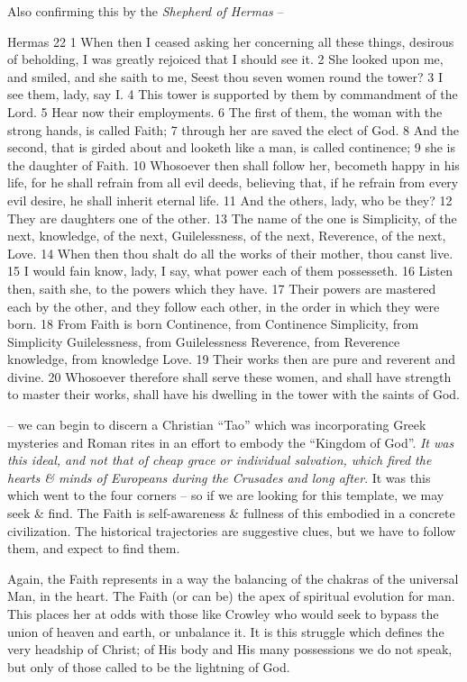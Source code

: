 Also confirming this by the \emph{Shepherd of Hermas} --

\begin{quotex}
Hermas 22 1 When then I ceased asking her concerning all these things, desirous of beholding, I was greatly rejoiced that I should see it. 2 She looked upon me, and smiled, and she saith to me, Seest thou seven women round the tower? 3 I see them, lady, say I. 4 This tower is supported by them by commandment of the Lord. 5 Hear now their employments. 6 The first of them, the woman with the strong hands, is called Faith; 7 through her are saved the elect of God. 8 And the second, that is girded about and looketh like a man, is called continence; 9 she is the daughter of Faith. 10 Whosoever then shall follow her, becometh happy in his life, for he shall refrain from all evil deeds, believing that, if he refrain from every evil desire, he shall inherit eternal life. 11 And the others, lady, who be they? 12 They are daughters one of the other. 13 The name of the one is Simplicity, of the next, knowledge, of the next, Guilelessness, of the next, Reverence, of the next, Love. 14 When then thou shalt do all the works of their mother, thou canst live. 15 I would fain know, lady, I say, what power each of them possesseth. 16 Listen then, saith she, to the powers which they have. 17 Their powers are mastered each by the other, and they follow each other, in the order in which they were born. 18 From Faith is born Continence, from Continence Simplicity, from Simplicity Guilelessness, from Guilelessness Reverence, from Reverence knowledge, from knowledge Love. 19 Their works then are pure and reverent and divine. 20 Whosoever therefore shall serve these women, and shall have strength to master their works, shall have his dwelling in the tower with the saints of God.
\end{quotex}


-- we can begin to discern a Christian ``Tao'' which was incorporating Greek mysteries and Roman rites in an effort to embody the ``Kingdom of God''. \emph{It was this ideal, and not that of cheap grace or individual salvation, which fired the hearts \& minds of Europeans during the Crusades and long after}. It was this which went to the four corners -- so if we are looking for this template, we may seek \& find. The Faith is self-awareness \& fullness of this embodied in a concrete civilization. The historical trajectories are suggestive clues, but we have to follow them, and expect to find them.

Again, the Faith represents in a way the balancing of the chakras of the universal Man, in the heart. The Faith (or can be) the apex of spiritual evolution for man. This places her at odds with those like Crowley who would seek to bypass the union of heaven and earth, or unbalance it. It is this struggle which defines the very headship of Christ; of His body and His many possessions we do not speak, but only of those called to be the lightning of God.

